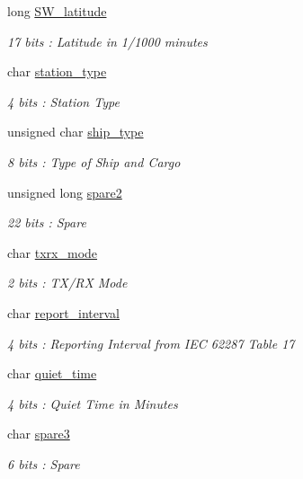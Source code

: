 \begin{DoxyCompactItemize}
long \mbox{\hyperlink{structaismsg__23_ac822afe7a2821e10a09e007e55616ad4}{S\+W\+\_\+latitude}}
\begin{DoxyCompactList}\small\item\em 17 bits \+: Latitude in 1/1000 minutes \end{DoxyCompactList}\item 
char \mbox{\hyperlink{structaismsg__23_a2bd301660a0f40633832c4433aceab11}{station\+\_\+type}}
\begin{DoxyCompactList}\small\item\em 4 bits \+: Station Type \end{DoxyCompactList}\item 
unsigned char \mbox{\hyperlink{structaismsg__23_af5e72a1092ef715a37048d1c687daced}{ship\+\_\+type}}
\begin{DoxyCompactList}\small\item\em 8 bits \+: Type of Ship and Cargo \end{DoxyCompactList}\item 
unsigned long \mbox{\hyperlink{structaismsg__23_ab89d257cab0e0e65a73ef850e683a7c4}{spare2}}
\begin{DoxyCompactList}\small\item\em 22 bits \+: Spare \end{DoxyCompactList}\item 
char \mbox{\hyperlink{structaismsg__23_a840683386b370ac6b11d9dce20a31f7c}{txrx\+\_\+mode}}
\begin{DoxyCompactList}\small\item\em 2 bits \+: T\+X/\+RX Mode \end{DoxyCompactList}\item 
char \mbox{\hyperlink{structaismsg__23_ac045e7c0b7f05c999d597ea7e2e79930}{report\+\_\+interval}}
\begin{DoxyCompactList}\small\item\em 4 bits \+: Reporting Interval from I\+EC 62287 Table 17 \end{DoxyCompactList}\item 
char \mbox{\hyperlink{structaismsg__23_a62581fdee5f20c04414ef03648573c58}{quiet\+\_\+time}}
\begin{DoxyCompactList}\small\item\em 4 bits \+: Quiet Time in Minutes \end{DoxyCompactList}\item 
char \mbox{\hyperlink{structaismsg__23_a9c2e91297f11b3807d6aa723b9c08284}{spare3}}
\begin{DoxyCompactList}\small\item\em 6 bits \+: Spare \end{DoxyCompactList}\end{DoxyCompactItemize}


